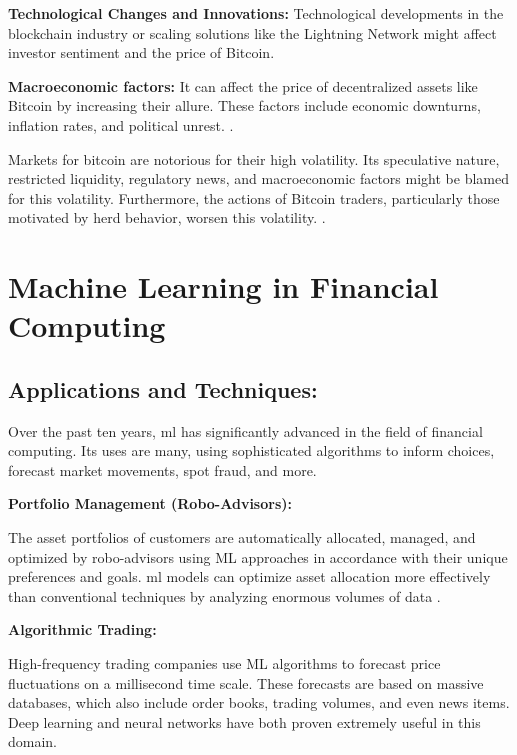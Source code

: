 \smallskip

\textbf{Technological Changes and Innovations:} Technological developments in the blockchain industry or scaling solutions like the Lightning Network might affect investor sentiment and the price of Bitcoin. \citep{easley_mining_2019}

\smallskip

\textbf{Macroeconomic factors:} It can affect the price of decentralized assets like Bitcoin by increasing their allure. These factors include economic downturns, inflation rates, and political unrest. \citep{urquhart_inefficiency_2016}.

\smallskip

Markets for bitcoin are notorious for their high volatility. Its speculative nature, restricted liquidity, regulatory news, and macroeconomic factors might be blamed for this volatility. Furthermore, the actions of Bitcoin traders, particularly those motivated by herd behavior, worsen this volatility. \citep{bouri_hedge_2017}.

\goodbreak

\section{Machine Learning in Financial Computing}
\goodbreak

\subsection{Applications and Techniques:}

Over the past ten years, \gls{ml} has significantly advanced in the field of financial computing. Its uses are many, using sophisticated algorithms to inform choices, forecast market movements, spot fraud, and more.

\smallskip

\textbf{Portfolio Management (Robo-Advisors):}

The asset portfolios of customers are automatically allocated, managed, and optimized by robo-advisors using ML approaches in accordance with their unique preferences and goals. \gls{ml} models can optimize asset allocation more effectively than conventional techniques by analyzing enormous volumes of data \citep{goldstein_investor_2017}.

\smallskip

\textbf{Algorithmic Trading:}

High-frequency trading companies use ML algorithms to forecast price fluctuations on a millisecond time scale. These forecasts are based on massive databases, which also include order books, trading volumes, and even news items. Deep learning and neural networks have both proven extremely useful in this domain. \citep{DBLP:journals/cacm/TreleavenGL13}

